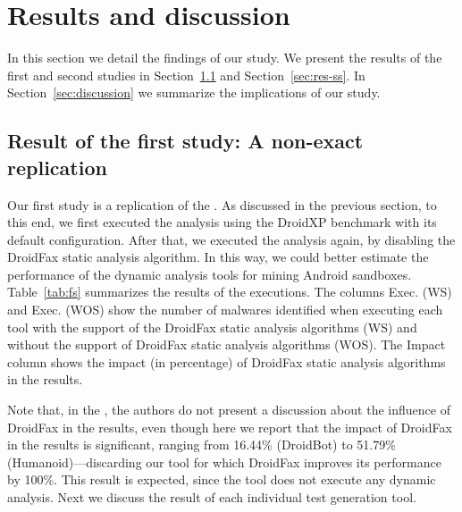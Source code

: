 \section{Results and discussion}

In this section we detail the findings of our study. We present the results of the first and
second studies in Section~\ref{sec:res-fs} and Section~\ref{sec:res-ss}. In Section~\ref{sec:discussion} we summarize the
implications of our study. 

\subsection{Result of the first study: A non-exact replication}\label{sec:res-fs}

Our first study is a replication of the \blls.
As discussed in the previous section, to this end, we first executed the analysis using the DroidXP benchmark with its default
configuration. After that, we executed the analysis again, by disabling the DroidFax static analysis algorithm.
In this way, we could better estimate the performance of the dynamic analysis tools for mining Android sandboxes.
Table~\ref{tab:fs} summarizes the results of the executions. The columns Exec. (WS) and Exec. (WOS) 
show the number of malwares identified when executing each tool with the
support of the DroidFax static analysis algorithms (WS) and without the support
of DroidFax static analysis algorithms (WOS). 
The Impact column shows the impact
(in percentage) of DroidFax static analysis algorithms in the results. 

Note that, in the \blls, the authors do not present a
discussion about the influence of DroidFax in the results, even
though here we report that the impact of DroidFax in the results is significant, ranging
from 16.44\% (DroidBot) to 51.79\% (Humanoid)---discarding our
\joke tool for which DroidFax improves its performance by 100\%. This result is
expected, since the \joke tool does not execute any dynamic analysis.
Next we discuss the result of each individual test generation tool. 

